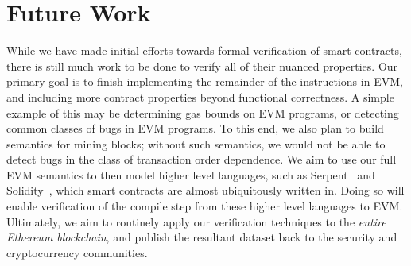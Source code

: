 \section{Future Work}
While we have made initial efforts towards formal verification of smart
contracts, there is still much work to be done to verify all of their nuanced
properties. Our primary goal is to finish implementing the remainder of the
instructions in EVM, and including more contract properties beyond functional
correctness. A simple example of this may be determining gas bounds on EVM
programs, or detecting common classes of bugs in EVM programs. To this end, we also plan to build
semantics for mining blocks; without such semantics, we would not be able to
detect bugs in the class of transaction order dependence. We aim to use our full EVM
semantics to then model higher level languages, such as Serpent~\cite{serpent}
and Solidity~\cite{solidity}, which smart contracts are almost ubiquitously
written in. Doing so will enable verification of the compile step from these higher
level languages to EVM. Ultimately, we aim to routinely apply our
verification techniques to the \textit{entire Ethereum blockchain}, and
publish the resultant dataset back to the security and cryptocurrency
communities.
